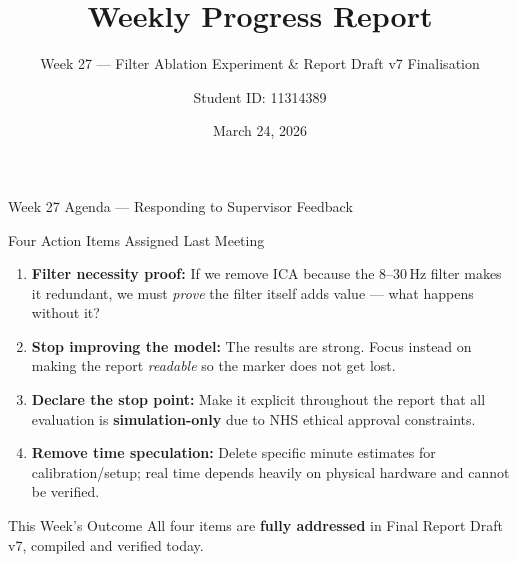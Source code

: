 \documentclass[aspectratio=169, 11pt]{beamer}
\title{Weekly Progress Report}
\subtitle{Week 27 --- Filter Ablation Experiment \& Report Draft v7 Finalisation}
\author{Student ID: 11314389}
\institute{BCI Control System Project}
\date{March 24, 2026}
\begin{document}
\begin{frame}
    \titlepage
\end{frame}

\begin{frame}{Week 27 Agenda --- Responding to Supervisor Feedback}

    \begin{block}{Four Action Items Assigned Last Meeting}
        \begin{enumerate}
            \item \textbf{Filter necessity proof:} If we remove ICA because the 8--30\,Hz filter makes it redundant, we must \emph{prove} the filter itself adds value --- what happens without it?
            \item \textbf{Stop improving the model:} The results are strong. Focus instead on making the report \emph{readable} so the marker does not get lost.
            \item \textbf{Declare the stop point:} Make it explicit throughout the report that all evaluation is \textbf{simulation-only} due to NHS ethical approval constraints.
            \item \textbf{Remove time speculation:} Delete specific minute estimates for calibration/setup; real time depends heavily on physical hardware and cannot be verified.
        \end{enumerate}
    \end{block}

    \vspace{2mm}
    \begin{alertblock}{This Week's Outcome}
        All four items are \textbf{fully addressed} in Final Report Draft v7, compiled and verified today.
    \end{alertblock}
\end{frame}
\end{document}
